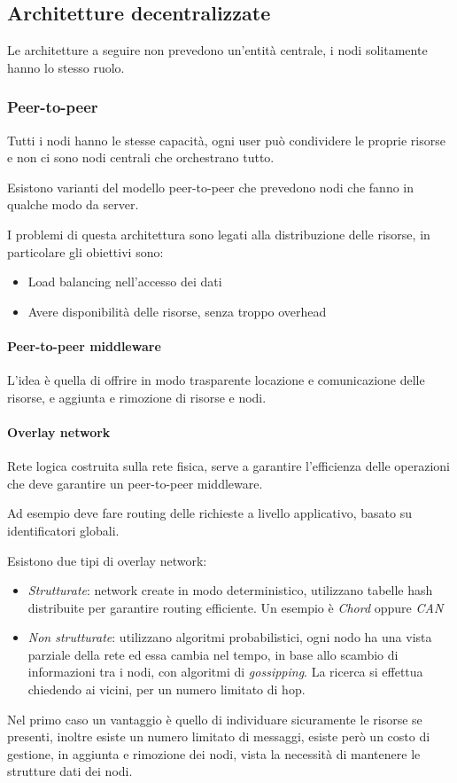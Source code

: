 \subsection{Architetture decentralizzate}
Le architetture a seguire non prevedono un'entità centrale, i nodi solitamente 
hanno lo stesso ruolo.

\subsubsection{Peer-to-peer}
Tutti i nodi hanno le stesse capacità, ogni user può condividere le proprie
risorse e non ci sono nodi centrali che orchestrano tutto.

Esistono varianti del modello peer-to-peer che prevedono nodi che fanno in 
qualche modo da server.

I problemi di questa architettura sono legati alla distribuzione delle risorse, 
in particolare gli obiettivi sono:
\begin{itemize}
    \item Load balancing nell'accesso dei dati
    \item Avere disponibilità delle risorse, senza troppo overhead
\end{itemize}

\paragraph{Peer-to-peer middleware}
L'idea è quella di offrire in modo trasparente locazione e comunicazione 
delle risorse, e aggiunta e rimozione di risorse e nodi.

\paragraph{Overlay network}
Rete logica costruita sulla rete fisica, serve a garantire l'efficienza
delle operazioni che deve garantire un peer-to-peer middleware.

Ad esempio deve fare routing delle richieste a livello applicativo, 
basato su identificatori globali.

Esistono due tipi di overlay network:
\begin{itemize}
    \item \emph{Strutturate}: network create in modo deterministico, utilizzano 
    tabelle hash distribuite per garantire routing efficiente. 
    Un esempio è \emph{Chord} oppure \emph{CAN}
    \item \emph{Non strutturate}: utilizzano algoritmi probabilistici, 
    ogni nodo ha una vista parziale della rete ed essa cambia nel tempo, 
    in base allo scambio di informazioni tra i nodi, con algoritmi di \emph{gossipping}.
    La ricerca si effettua chiedendo ai vicini, per un numero limitato di hop.
\end{itemize}
Nel primo caso un vantaggio è quello di individuare sicuramente le risorse se presenti,
inoltre esiste un numero limitato di messaggi, esiste però un costo di gestione, 
in aggiunta e rimozione dei nodi, vista la necessità di mantenere le strutture 
dati dei nodi.

